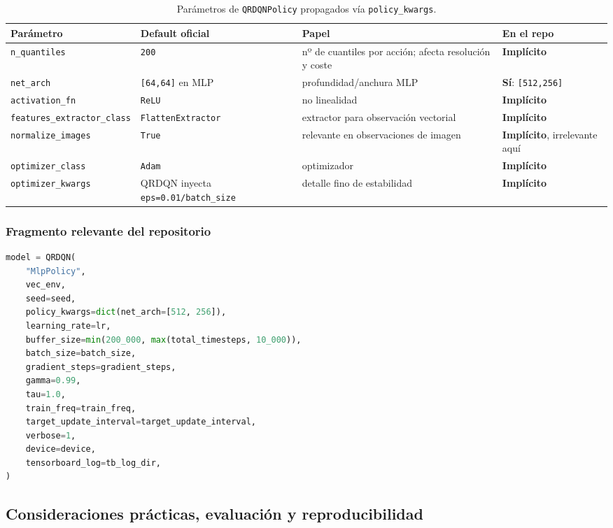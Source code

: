 ﻿\documentclass[12pt,a4paper]{article}
\begin{document}
\begin{table}[htbp]
\caption{Parámetros de \texttt{QRDQNPolicy} propagados vía \texttt{policy\_kwargs}.}
\footnotesize
\begin{tabular}{p{3.5cm}p{3.5cm}p{3.5cm}p{3cm}}
\hline
\textbf{Parámetro} & \textbf{Default oficial} & \textbf{Papel} & \textbf{En el repo} \\
\hline
\texttt{n\_quantiles}
  & \texttt{200}
  & nº de cuantiles por acción; afecta resolución y coste
  & \textbf{Implícito} \\
\texttt{net\_arch}
  & \texttt{[64,64]} en MLP
  & profundidad/anchura MLP
  & \textbf{Sí}: \texttt{[512,256]} \\
\texttt{activation\_fn}
  & \texttt{ReLU}
  & no linealidad
  & \textbf{Implícito} \\
\texttt{features\_extractor\_class}
  & \texttt{FlattenExtractor}
  & extractor para observación vectorial
  & \textbf{Implícito} \\
\texttt{normalize\_images}
  & \texttt{True}
  & relevante en observaciones de imagen
  & \textbf{Implícito}, irrelevante aquí \\
\texttt{optimizer\_class}
  & \texttt{Adam}
  & optimizador
  & \textbf{Implícito} \\
\texttt{optimizer\_kwargs}
  & QRDQN inyecta \texttt{eps=0.01/batch\_size}
  & detalle fino de estabilidad
  & \textbf{Implícito} \\
\hline
\end{tabular}
\end{table}

\subsubsection{Fragmento relevante del repositorio}

\begin{lstlisting}[language=Python]
model = QRDQN(
    "MlpPolicy",
    vec_env,
    seed=seed,
    policy_kwargs=dict(net_arch=[512, 256]),
    learning_rate=lr,
    buffer_size=min(200_000, max(total_timesteps, 10_000)),
    batch_size=batch_size,
    gradient_steps=gradient_steps,
    gamma=0.99,
    tau=1.0,
    train_freq=train_freq,
    target_update_interval=target_update_interval,
    verbose=1,
    device=device,
    tensorboard_log=tb_log_dir,
)
\end{lstlisting}

\subsection{Consideraciones prácticas, evaluación y reproducibilidad}
\end{document}

